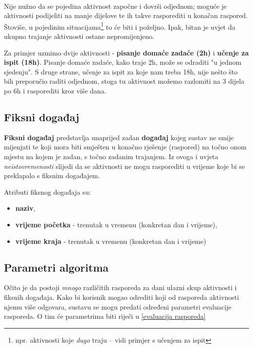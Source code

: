 \documentclass[times, utf8, zavrsni]{fer}
\begin{document}
\paragraph{}

Nije nužno da se pojedina aktivnost započne i dovrši odjednom; moguće je aktivnosti podijeliti na manje dijelove te ih takve rasporediti u konačan raspored. Štoviše, u pojedinim situacijama\footnote{npr. aktivnosti koje \textit{dugo} traju -- vidi primjer s učenjem za ispit} to će biti i poželjno. Ipak, bitan je uvjet da ukupno trajanje aktivnosti ostane nepromijenjeno.

Za primjer uzmimo dvije aktivnosti - \textbf{pisanje domaće zadaće (2h)} i \textbf{učenje za ispit (18h)}. Pisanje domaće zadaće, kako traje 2h, može se odraditi "u jednom sjedenju". S druge strane, učenje za ispit za koje nam treba 18h, nije nešto što bih preporučio raditi odjednom, stoga tu aktivnost možemo razlomiti na 3 dijela po 6h i rasporediti kroz više dana.

\subsection{Fiksni događaj}\label{fiksni dogadaj}
\textbf{Fiksni događaj} predstavlja unaprijed zadan \textbf{događaj} kojeg sustav ne smije mijenjati te koji mora biti smješten u konačno rješenje (raspored) na točno onom mjestu na kojem je zadan, s točno zadanim trajanjem. Iz ovoga i uvjeta \textit{neistovremenosti} slijedi da se aktivnosti ne mogu rasporediti u vrijeme koje bi se preklapalo s fiksnim događajem.

Atributi fiksnog događaja su:
\begin{itemize}
  \item \textbf{naziv},
  \item \textbf{vrijeme početka} - trenutak u vremenu (konkretan dan i vrijeme),
  \item \textbf{vrijeme kraja} - trenutak u vremenu (konkretan dan i vrijeme)
\end{itemize}

\subsection{Parametri algoritma}
Očito je da postoji \textit{mnogo} različitih rasporeda za dani ulazni skup aktivnosti i fiksnih događaja. Kako bi korisnik mogao odrediti koji od rasporeda aktivnosti njemu više odgovara, sustavu se mogu predati određeni parametri evaluacije rasporeda. O tim će parametrima biti riječi u \ref{evaluacija rasporeda}
\end{document}
